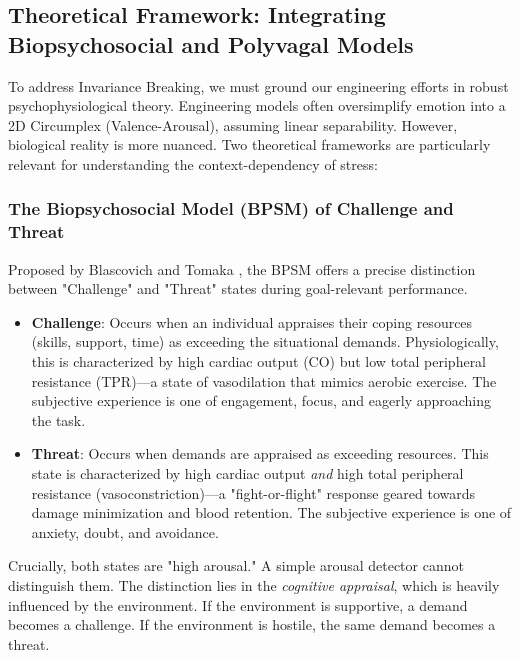 \documentclass[journal]{IEEEtran}
\begin{document}
\subsection{Theoretical Framework: Integrating Biopsychosocial and Polyvagal Models}
To address Invariance Breaking, we must ground our engineering efforts in robust psychophysiological theory. 
Engineering models often oversimplify emotion into a 2D Circumplex (Valence-Arousal), assuming linear separability. 
However, biological reality is more nuanced. Two theoretical frameworks are particularly relevant for understanding the context-dependency of stress:

\subsubsection{The Biopsychosocial Model (BPSM) of Challenge and Threat}
Proposed by Blascovich and Tomaka \cite{biopsychosocial_model}, the BPSM offers a precise distinction between "Challenge" and "Threat" states 
during goal-relevant performance.
\begin{itemize}
    \item \textbf{Challenge}: Occurs when an individual appraises their coping resources (skills, support, time) as exceeding the situational demands. 
    Physiologically, this is characterized by high cardiac output (CO) but low total peripheral resistance (TPR)—a state of vasodilation 
    that mimics aerobic exercise. The subjective experience is one of engagement, focus, and eagerly approaching the task.
    \item \textbf{Threat}: Occurs when demands are appraised as exceeding resources. This state is characterized by high cardiac output 
    \textit{and} high total peripheral resistance (vasoconstriction)—a "fight-or-flight" response geared towards damage minimization and blood retention. 
    The subjective experience is one of anxiety, doubt, and avoidance.
\end{itemize}
Crucially, both states are "high arousal." A simple arousal detector cannot distinguish them. 
The distinction lies in the \textit{cognitive appraisal}, which is heavily influenced by the environment. 
If the environment is supportive, a demand becomes a challenge. If the environment is hostile, the same demand becomes a threat.
\end{document}
